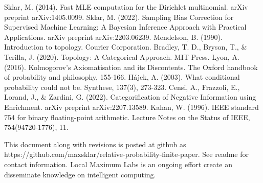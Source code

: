 \documentclass[twoside]{article}
\theoremstyle{plain}%
\theoremstyle{definition}
\theoremstyle{remark}
\begin{document}
\begin{thebibliography}{20}

Sklar, M. (2014). Fast MLE computation for the Dirichlet multinomial. arXiv preprint arXiv:1405.0099.
Sklar, M. (2022). Sampling Bias Correction for Supervised Machine Learning: A Bayesian Inference Approach with Practical Applications. arXiv preprint arXiv:2203.06239.
Mendelson, B. (1990). Introduction to topology. Courier Corporation.
Bradley, T. D., Bryson, T., \& Terilla, J. (2020). Topology: A Categorical Approach. MIT Press.
Lyon, A. (2016). Kolmogorov’s Axiomatisation and its Discontents. The Oxford handbook of probability and philosophy, 155-166.
Hájek, A. (2003). What conditional probability could not be. Synthese, 137(3), 273-323.
Censi, A., Frazzoli, E., Lorand, J., \& Zardini, G. (2022). Categorification of Negative Information using Enrichment. arXiv preprint arXiv:2207.13589.
Kahan, W. (1996). IEEE standard 754 for binary floating-point arithmetic. Lecture Notes on the Status of IEEE, 754(94720-1776), 11.

\end{thebibliography}

This document along with revisions is posted at github as https://github.com/maxsklar/relative-probability-finite-paper. See readme for contact information. Local Maximum Labs is an ongoing effort create an disseminate knowledge on intelligent computing.
\end{document}
